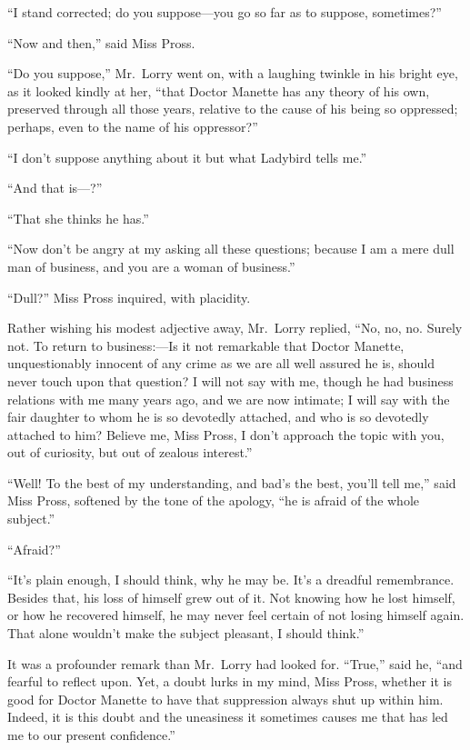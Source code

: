 ``I stand corrected; do you suppose---you go so far as to suppose, sometimes?''

``Now and then,'' said Miss Pross.

``Do you suppose,'' Mr.\ Lorry went on, with a laughing twinkle in his
bright eye, as it looked kindly at her, ``that Doctor Manette has any
theory of his own, preserved through all those years, relative to the
cause of his being so oppressed; perhaps, even to the name of his
oppressor?''

``I don't suppose anything about it but what Ladybird tells me.''

``And that is---?''

``That she thinks he has.''

``Now don't be angry at my asking all these questions; because I am a
mere dull man of business, and you are a woman of business.''

``Dull?'' Miss Pross inquired, with placidity.

Rather wishing his modest adjective away, Mr.\ Lorry replied, ``No, no,
no. Surely not.  To return to business:---Is it not remarkable that
Doctor Manette, unquestionably innocent of any crime as we are all
well assured he is, should never touch upon that question?  I will not
say with me, though he had business relations with me many years ago,
and we are now intimate; I will say with the fair daughter to whom he
is so devotedly attached, and who is so devotedly attached to him?
Believe me, Miss Pross, I don't approach the topic with you, out of
curiosity, but out of zealous interest.''

``Well!  To the best of my understanding, and bad's the best,
you'll tell me,'' said Miss Pross, softened by the tone of the apology,
``he is afraid of the whole subject.''

``Afraid?''

``It's plain enough, I should think, why he may be.  It's a dreadful
remembrance.  Besides that, his loss of himself grew out of it.
Not knowing how he lost himself, or how he recovered himself, he may
never feel certain of not losing himself again.  That alone wouldn't
make the subject pleasant, I should think.''

It was a profounder remark than Mr.\ Lorry had looked for.  ``True,''
said he, ``and fearful to reflect upon.  Yet, a doubt lurks in my mind,
Miss Pross, whether it is good for Doctor Manette to have that
suppression always shut up within him.  Indeed, it is this doubt and
the uneasiness it sometimes causes me that has led me to our present
confidence.''

